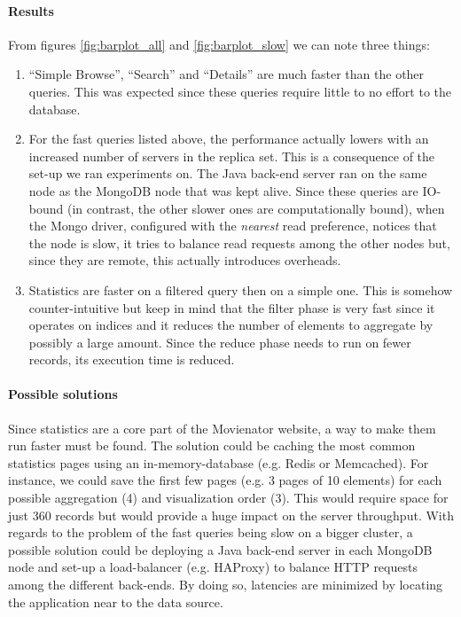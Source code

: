 \documentclass[11pt]{article}
\begin{document}
\paragraph{Results}
From figures \ref{fig:barplot_all} and \ref{fig:barplot_slow} we can note three things:
\begin{enumerate}
	\item ``Simple Browse'', ``Search'' and ``Details'' are much faster than the other queries. This was expected since these queries require little to 
	no effort to the database. 
	\item For the fast queries listed above, the performance actually lowers with an increased number of servers in the replica set. This is a consequence of the set-up we ran experiments on. The Java back-end server ran on the same node as the MongoDB node that was kept alive. Since these queries are IO-bound (in contrast, the other slower ones are computationally bound), when the Mongo driver, configured with the \emph{nearest} read preference, notices that the node is slow, it tries to balance read requests among the other nodes but, since they are remote, this actually introduces overheads.
	\item Statistics are faster on a filtered query then on a simple one. This is somehow counter-intuitive but keep in mind that the filter phase is very fast since it operates on indices and it reduces the number of elements to aggregate by possibly a large amount. Since the reduce phase needs to run on fewer records, its execution time is reduced.
\end{enumerate}

\paragraph{Possible solutions}
Since statistics are a core part of the Movienator website, a way to make them run faster must be found. The solution could be caching the most common statistics pages using an in-memory-database (e.g. Redis or Memcached). For instance, we could save the first few pages (e.g. 3 pages of 10 elements) for each possible aggregation (4) and visualization order (3). This would require space for just 360 records but would provide a huge impact on the server throughput. With regards to the problem of the fast queries being slow on a bigger cluster, a possible solution could be deploying a Java back-end server in each MongoDB node and set-up a load-balancer (e.g. HAProxy) to balance HTTP requests among the different back-ends. By doing so, latencies are minimized by locating the application near to the data source.
\end{document}
